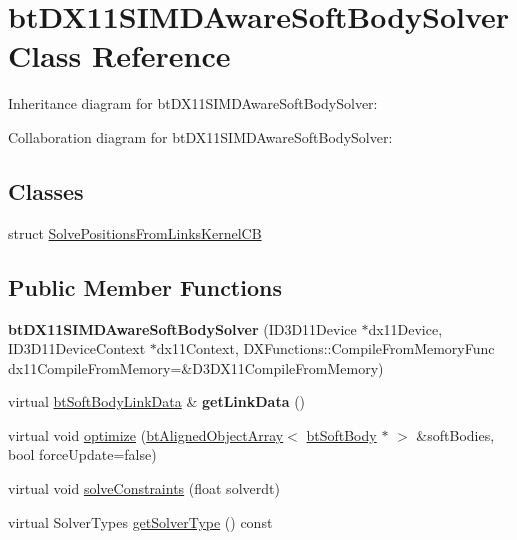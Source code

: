 \hypertarget{classbt_d_x11_s_i_m_d_aware_soft_body_solver}{\section{bt\+D\+X11\+S\+I\+M\+D\+Aware\+Soft\+Body\+Solver Class Reference}
\label{classbt_d_x11_s_i_m_d_aware_soft_body_solver}
}


Inheritance diagram for bt\+D\+X11\+S\+I\+M\+D\+Aware\+Soft\+Body\+Solver\+:


Collaboration diagram for bt\+D\+X11\+S\+I\+M\+D\+Aware\+Soft\+Body\+Solver\+:
\subsection*{Classes}
\begin{DoxyCompactItemize}
\item 
struct \hyperlink{structbt_d_x11_s_i_m_d_aware_soft_body_solver_1_1_solve_positions_from_links_kernel_c_b}{Solve\+Positions\+From\+Links\+Kernel\+C\+B}
\end{DoxyCompactItemize}
\subsection*{Public Member Functions}
\begin{DoxyCompactItemize}
\item 
\hypertarget{classbt_d_x11_s_i_m_d_aware_soft_body_solver_aa01252079f411bddde26f0836209c4a8}{{\bfseries bt\+D\+X11\+S\+I\+M\+D\+Aware\+Soft\+Body\+Solver} (I\+D3\+D11\+Device $\ast$dx11\+Device, I\+D3\+D11\+Device\+Context $\ast$dx11\+Context, D\+X\+Functions\+::\+Compile\+From\+Memory\+Func dx11\+Compile\+From\+Memory=\&D3\+D\+X11\+Compile\+From\+Memory)}\label{classbt_d_x11_s_i_m_d_aware_soft_body_solver_aa01252079f411bddde26f0836209c4a8}

\item 
\hypertarget{classbt_d_x11_s_i_m_d_aware_soft_body_solver_a2c7059670bbf3653f1828114ccf28e8e}{virtual \hyperlink{classbt_soft_body_link_data}{bt\+Soft\+Body\+Link\+Data} \& {\bfseries get\+Link\+Data} ()}\label{classbt_d_x11_s_i_m_d_aware_soft_body_solver_a2c7059670bbf3653f1828114ccf28e8e}

\item 
virtual void \hyperlink{classbt_d_x11_s_i_m_d_aware_soft_body_solver_a575cf63485ef6a9a55f045e13dcb7717}{optimize} (\hyperlink{classbt_aligned_object_array}{bt\+Aligned\+Object\+Array}$<$ \hyperlink{classbt_soft_body}{bt\+Soft\+Body} $\ast$ $>$ \&soft\+Bodies, bool force\+Update=false)
\item 
virtual void \hyperlink{classbt_d_x11_s_i_m_d_aware_soft_body_solver_ae78972e067e72a8b5cb51ad05def50df}{solve\+Constraints} (float solverdt)
\item 
virtual Solver\+Types \hyperlink{classbt_d_x11_s_i_m_d_aware_soft_body_solver_a00e95eed93b05231e9cd02137a7be741}{get\+Solver\+Type} () const 
\end{DoxyCompactItemize}
